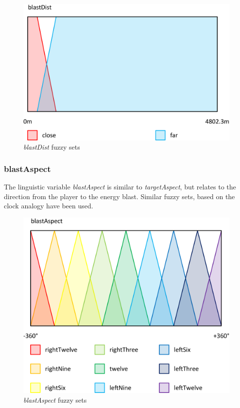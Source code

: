 \begin{figure}[H]
\centering
\caption{\emph{blastDist} fuzzy sets}
\includegraphics[scale=0.08]{./img/pdf/blastDistSets.pdf}
\end{figure}

\subsubsection{blastAspect}

The linguistic variable \emph{blastAspect} is similar to \emph{targetAspect}, but relates to the direction from the player to the energy blast. Similar fuzzy sets, based on the clock analogy have been used.

\begin{figure}[H]
\centering
\caption{\emph{blastAspect} fuzzy sets}
\includegraphics[scale=0.08]{./img/pdf/blastAspectSets.pdf}
\end{figure}

